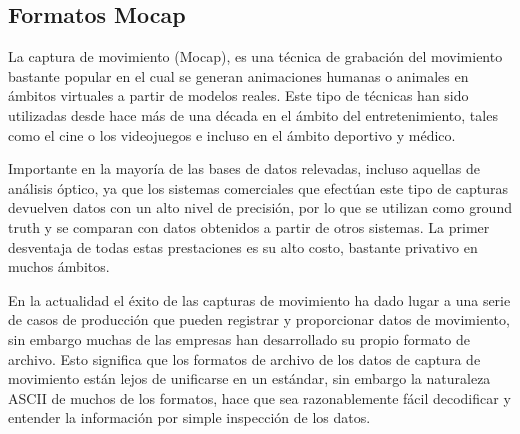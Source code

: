 \subsection{Formatos Mocap}\label{formatos_MoCap}
La captura de movimiento (Mocap), es una técnica de grabación del movimiento bastante popular en el cual se generan animaciones humanas o animales en ámbitos virtuales a partir de modelos reales. Este tipo de técnicas han sido utilizadas desde hace más de una década en el ámbito del entretenimiento, tales como el cine o los videojuegos e incluso en el ámbito deportivo y médico. 


Importante en la mayoría de las bases de datos relevadas, incluso aquellas de análisis óptico, ya que los sistemas comerciales que efectúan este tipo de capturas devuelven datos con un alto nivel de precisión, por lo que se utilizan como ground truth y se comparan con datos obtenidos a partir de otros sistemas. La primer desventaja de todas estas prestaciones es su alto costo, bastante privativo en muchos ámbitos.

En la actualidad el éxito de las capturas de movimiento ha dado lugar a una serie de casos de producción que pueden registrar y proporcionar datos de movimiento, sin embargo muchas de las empresas han desarrollado su propio formato de archivo. Esto significa que los formatos de archivo de los datos de captura de movimiento
están lejos de unificarse en un estándar, sin embargo la naturaleza ASCII de muchos de los formatos, hace que sea razonablemente fácil decodificar y entender la información por simple inspección de los datos.

